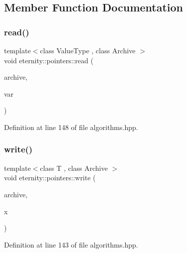 \subsection{Member Function Documentation}
\mbox{\label{structeternity_1_1pointers_a393c2b0b219bf16b8fcc372aaa19f185}} 
\subsubsection{\texorpdfstring{read()}{read()}}
{\footnotesize\ttfamily template$<$class Value\+Type , class Archive $>$ \\
void eternity\+::pointers\+::read (\begin{DoxyParamCaption}\item[{Archive \&}]{archive,  }\item[{Value\+Type $\ast$}]{var }\end{DoxyParamCaption})}



Definition at line 148 of file algorithms.\+hpp.

\mbox{\label{structeternity_1_1pointers_a5b2f7a5240aa5f6b19b3e615886ae5a3}} 
\subsubsection{\texorpdfstring{write()}{write()}}
{\footnotesize\ttfamily template$<$class T , class Archive $>$ \\
void eternity\+::pointers\+::write (\begin{DoxyParamCaption}\item[{Archive \&}]{archive,  }\item[{T \&}]{x }\end{DoxyParamCaption})}



Definition at line 143 of file algorithms.\+hpp.

\mbox{\label{structeternity_1_1pointers_a82633874b86bdf07241befe07601fa10}} 
